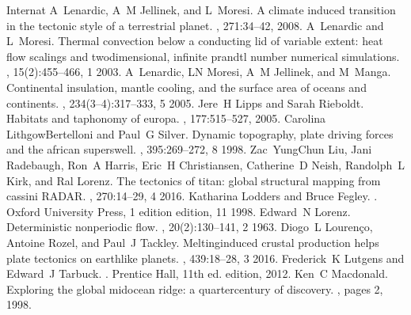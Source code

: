 \documentclass[letterpaper,10pt,english]{jupyterBook}
\begin{document}
\begin{sphinxthebibliography}{Internat}
\sphinxAtStartPar
A Lenardic, A M Jellinek, and L Moresi. A climate induced transition in the tectonic style of a terrestrial planet. , 271:34–42, 2008.
\sphinxAtStartPar
A Lenardic and L Moresi. Thermal convection below a conducting lid of variable extent: heat flow scalings and two\sphinxhyphen{}dimensional, infinite prandtl number numerical simulations. , 15(2):455–466, 1 2003.
\sphinxAtStartPar
A Lenardic, L\sphinxhyphen{}N Moresi, A M Jellinek, and M Manga. Continental insulation, mantle cooling, and the surface area of oceans and continents. , 234(3–4):317–333, 5 2005.
\sphinxAtStartPar
Jere H Lipps and Sarah Rieboldt. Habitats and taphonomy of europa. , 177:515–527, 2005.
\sphinxAtStartPar
Carolina Lithgow\sphinxhyphen{}Bertelloni and Paul G Silver. Dynamic topography, plate driving forces and the african superswell. , 395:269–272, 8 1998.
\sphinxAtStartPar
Zac Yung\sphinxhyphen{}Chun Liu, Jani Radebaugh, Ron A Harris, Eric H Christiansen, Catherine D Neish, Randolph L Kirk, and Ral Lorenz. The tectonics of titan: global structural mapping from cassini RADAR. , 270:14–29, 4 2016.
\sphinxAtStartPar
Katharina Lodders and Bruce Fegley. . Oxford University Press, 1 edition edition, 11 1998.
\sphinxAtStartPar
Edward N Lorenz. Deterministic nonperiodic flow. , 20(2):130–141, 2 1963.
\sphinxAtStartPar
Diogo L Lourenço, Antoine Rozel, and Paul J Tackley. Melting\sphinxhyphen{}induced crustal production helps plate tectonics on earth\sphinxhyphen{}like planets. , 439:18–28, 3 2016.
\sphinxAtStartPar
Frederick K Lutgens and Edward J Tarbuck. . Prentice Hall, 11th ed. edition, 2012.
\sphinxAtStartPar
Ken C Macdonald. Exploring the global mid\sphinxhyphen{}ocean ridge: a quarter\sphinxhyphen{}century of discovery. , pages 2, 1998.
\sphinxAtStartPar

\end{sphinxthebibliography}
\end{document}
